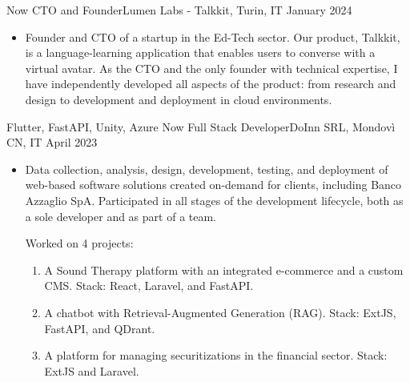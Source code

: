\begin{experiences}
        \experience
	{Now}   {CTO and Founder}{Lumen Labs - Talkkit, Turin, IT}
	{January 2024} {
		\begin{itemize}
			\item Founder and CTO of a startup in the Ed-Tech sector. Our product, Talkkit, is a language-learning application that enables users to converse with a virtual avatar. As the CTO and the only founder with technical expertise, I have independently developed all aspects of the product: from research and design to development and deployment in cloud environments.
		\end{itemize}
	}
	{Flutter, FastAPI, Unity, Azure}
	\emptySeparator
	\emptySeparator
	\experience
	{Now}   {Full Stack Developer}{DoInn SRL, Mondovì CN, IT}
	{April 2023} {
		\begin{itemize}
			\item Data collection, analysis, design, development, testing, and deployment of web-based software solutions created on-demand for clients, including Banco Azzaglio SpA. Participated in all stages of the development lifecycle, both as a sole developer and as part of a team.
            
            Worked on 4 projects: 
            \begin{enumerate}
            \item A Sound Therapy platform with an integrated e-commerce and a custom CMS. Stack: React, Laravel, and FastAPI. 
            
            \item A chatbot with Retrieval-Augmented Generation (RAG). Stack: ExtJS, FastAPI, and QDrant. 
            
            \item A platform for managing securitizations in the financial sector. Stack: ExtJS and Laravel. 
            

\end{enumerate}
\end{itemize}}
\end{experiences}
